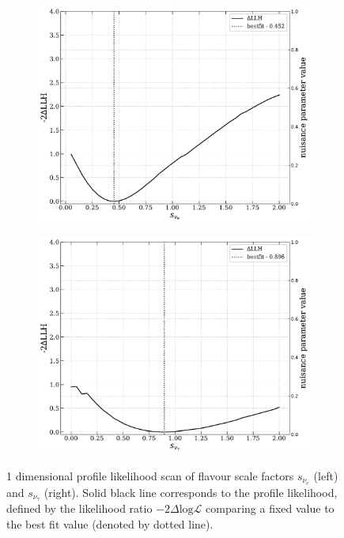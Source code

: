 \begin{figure}[h!]
    \begin{subfigure}[h]{0.7\textwidth}
        \includegraphics{./figures/results/profile_scan_astro_nue_ratio.pdf}
    \end{subfigure}
    \hfill
    \begin{subfigure}[h]{0.7\textwidth}
        \includegraphics{./figures/results/profile_scan_astro_nutau_ratio.pdf}
    \end{subfigure}
    
    \caption[one dimensional profile likelihood scans of flavour scale factors $s_{\nu_{e}}$ and $s_{\nu_{\tau}}$]{1 dimensional profile likelihood scan of flavour scale factors $s_{\nu_{e}}$ (left) and $s_{\nu_{\tau}}$ (right). Solid black line corresponds to the profile likelihood, defined by the likelihood ratio $-2\Delta\mathrm{log}\mathcal{L}$ comparing a fixed value to the best fit value (denoted by dotted line).}
\end{figure}

